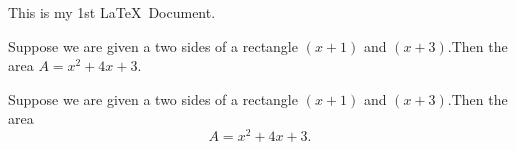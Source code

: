 \documentclass[11pt]{article}
\begin{document}
	This is my 1st \LaTeX  \ Document.
	
	Suppose we are given a two sides of a rectangle $(x+1)$ and $(x+3)$.Then the area $A=x^2+4x+3.$
	
	Suppose we are given a two sides of a rectangle $(x+1)$ and $(x+3)$.Then the area $$A=x^2+4x+3.$$
\end{document}
